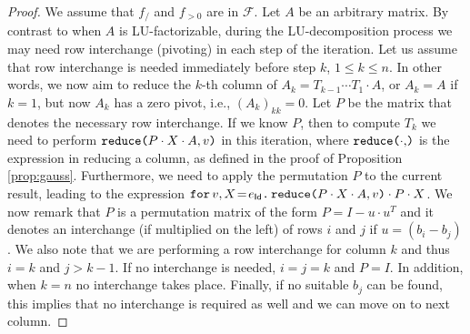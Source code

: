 \begin{proof}

    We assume that $f_{/}$ and $f_{>0}$ are in $\mathcal{F}$. Let $A$ be an arbitrary matrix.
    By contrast to when $A$ is LU-factorizable, during the LU-decomposition process we may need row interchange (pivoting) in each step of the iteration. Let us assume that row interchange is needed immediately before 
    step $k$, $1\leq k\leq n$. In other words, we now aim to reduce the $k$-th column of $A_k=T_{k-1}\cdots T_1\cdot A$, 
    or $A_k=A$ if $k=1$, but now $A_k$ has a zero pivot, i.e., $(A_{k})_{kk}=0$. 
    Let $P$ be the matrix that denotes the necessary row interchange. If we know
    $P$, then 
    to compute $T_k$ we need to perform $\red{P\cdot X\cdot A}{v}$ in this iteration,
    where $\red{\cdot}$ is the expression in \langfor reducing a column, as defined in the proof of Proposition \ref{prop:gauss}.
    Furthermore, we need to apply the permutation $P$ to the current result, leading to the 
    expression $\initf{e_{\mathsf{Id}}}{v}{X}{\red{P\cdot X\cdot A}{v}\cdot P\cdot X}$. We now remark that
    $P$ is a permutation matrix of the  form $P = I - u\cdot u^T$ and it denotes an interchange (if multiplied on the left) of rows $i$ and $j$ if $u=(b_{i}-b_{j})$. We also note that we are performing a row interchange for column $k$ and thus $i=k$ and $j>k-1$. If no interchange is needed, $i=j=k$ and $P=I$.
    In addition, when $k=n$ no interchange takes place. Finally, if no suitable $b_j$ can
    be found, this implies that no interchange is required as well and we can move on to next column.


\end{proof}
